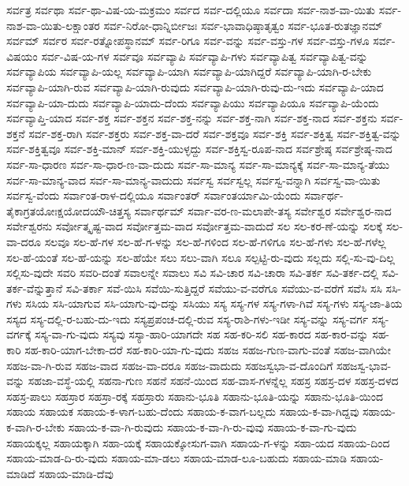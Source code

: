 {ಸರ್ವತ್ರ
ಸರ್ವಥಾ
ಸರ್ವ-ಥಾ-ವಿಷ-ಯ-ಮಕ್ರಮಂ
ಸರ್ವದ
ಸರ್ವ-ದಲ್ಲಿಯೂ
ಸರ್ವದಾ
ಸರ್ವ-ನಾಶ-ವಾ-ಯಿತು
ಸರ್ವ-ನಾಶ-ವಾ-ಯಿತು-ಲಕ್ಷಾಂತರ
ಸರ್ವ-ನಿರೋ-ಧಾನ್ನಿರ್ಬೀಜಃ
ಸರ್ವ-ಭಾವಾಧಿಷ್ಠಾತೃತ್ವಂ
ಸರ್ವ-ಭೂತ-ರುತಜ್ಞಾನಮ್
ಸರ್ವಮ್
ಸರ್ವರ
ಸರ್ವ-ರತ್ನೋಪಸ್ಥಾನಮ್
ಸರ್ವ-ರಿಗೂ
ಸರ್ವ-ವನ್ನು
ಸರ್ವ-ವಸ್ತು-ಗಳ
ಸರ್ವ-ವಸ್ತು-ಗಳೂ
ಸರ್ವ-ವಿಷಯಂ
ಸರ್ವ-ವಿಷ-ಯ-ಗಳ
ಸರ್ವವೂ
ಸರ್ವವ್ಯಾಪಿ
ಸರ್ವವ್ಯಾಪಿ-ಗಳು
ಸರ್ವವ್ಯಾಪಿತ್ವ
ಸರ್ವವ್ಯಾಪಿತ್ವ-ವನ್ನು
ಸರ್ವವ್ಯಾಪಿಯ
ಸರ್ವವ್ಯಾಪಿ-ಯಲ್ಲ
ಸರ್ವವ್ಯಾಪಿ-ಯಾಗಿ
ಸರ್ವವ್ಯಾಪಿ-ಯಾಗಿದ್ದರೆ
ಸರ್ವವ್ಯಾಪಿ-ಯಾಗಿ-ರ-ಬೇಕು
ಸರ್ವವ್ಯಾಪಿ-ಯಾಗಿ-ರುವ
ಸರ್ವವ್ಯಾಪಿ-ಯಾಗಿ-ರುವುದು
ಸರ್ವವ್ಯಾಪಿ-ಯಾಗಿ-ರುವು-ದು-ಇದು
ಸರ್ವವ್ಯಾಪಿ-ಯಾದ
ಸರ್ವವ್ಯಾಪಿ-ಯಾ-ದುದು
ಸರ್ವವ್ಯಾಪಿ-ಯಾದು-ದೆಂದು
ಸರ್ವವ್ಯಾಪಿಯು
ಸರ್ವವ್ಯಾಪಿಯೂ
ಸರ್ವವ್ಯಾಪಿ-ಯೆಂದು
ಸರ್ವವ್ಯಾಪ್ತಿ-ಯಾದ
ಸರ್ವ-ಶಕ್ತ
ಸರ್ವ-ಶಕ್ತನ
ಸರ್ವ-ಶಕ್ತ-ನನ್ನು
ಸರ್ವ-ಶಕ್ತ-ನಾಗಿ
ಸರ್ವ-ಶಕ್ತ-ನಾದ
ಸರ್ವ-ಶಕ್ತನು
ಸರ್ವ-ಶಕ್ತನೆ
ಸರ್ವ-ಶಕ್ತ-ರಾಗಿ
ಸರ್ವ-ಶಕ್ತರು
ಸರ್ವ-ಶಕ್ತ-ವಾ-ದರೆ
ಸರ್ವ-ಶಕ್ತವೂ
ಸರ್ವ-ಶಕ್ತಿ
ಸರ್ವ-ಶಕ್ತಿತ್ವ
ಸರ್ವ-ಶಕ್ತಿತ್ವ-ವನ್ನು
ಸರ್ವ-ಶಕ್ತಿತ್ವವೂ
ಸರ್ವ-ಶಕ್ತಿ-ಮಾನ್
ಸರ್ವ-ಶಕ್ತಿ-ಯುಳ್ಳದ್ದು
ಸರ್ವ-ಶಕ್ತಿಸ್ವ-ರೂಪ-ನಾದ
ಸರ್ವಶ್ರೇಷ್ಠ
ಸರ್ವಶ್ರೇಷ್ಠ-ನಾದ
ಸರ್ವ-ಸಾ-ಧಾರಣ
ಸರ್ವ-ಸಾ-ಧಾರ-ಣ-ವಾ-ದುದು
ಸರ್ವ-ಸಾ-ಮಾನ್ಯ
ಸರ್ವ-ಸಾ-ಮಾನ್ಯಕ್ಕೆ
ಸರ್ವ-ಸಾ-ಮಾನ್ಯ-ತೆಯು
ಸರ್ವ-ಸಾ-ಮಾನ್ಯ-ವಾದ
ಸರ್ವ-ಸಾ-ಮಾನ್ಯ-ವಾದುದು
ಸರ್ವಸ್ವ
ಸರ್ವಸ್ವಲ್ಲ
ಸರ್ವಸ್ವ-ವನ್ನಾಗಿ
ಸರ್ವಸ್ವ-ವಾ-ಯಿತು
ಸರ್ವಸ್ವ-ವೆಂದು
ಸರ್ವಾಂತ-ರಾಳ-ದಲ್ಲಿಯೂ
ಸರ್ವಾಂತರ್
ಸರ್ವಾಂತರ್ಯಾಮಿ-ಯೆಂದು
ಸರ್ವಾರ್ಥ-ತೈಕಾಗ್ರತಯೋಃಕ್ಷಯೋದಯೌ-ಚಿತ್ತಸ್ಯ
ಸರ್ವಾರ್ಥಮ್
ಸರ್ವಾ-ವರ-ಣ-ಮಲಾಪೇ-ತಸ್ಯ
ಸರ್ವೇಶ್ವರ
ಸರ್ವೇಶ್ವರ-ನಾದ
ಸರ್ವೇಶ್ವರನು
ಸರ್ವೋತ್ಕೃಷ್ಟ-ವಾದ
ಸರ್ವೋತ್ತಮ-ವಾದ
ಸರ್ವೋತ್ತಮ-ವಾದುದೆ
ಸಲ
ಸಲ-ಕರ-ಣೆ-ಯನ್ನು
ಸಲಕ್ಕೆ
ಸಲ-ವಾ-ದರೂ
ಸಲವೂ
ಸಲ-ಹೆ-ಗಳ
ಸಲ-ಹೆ-ಗ-ಳನ್ನು
ಸಲ-ಹೆ-ಗಳಿಂದ
ಸಲ-ಹೆ-ಗಳಿಗೂ
ಸಲ-ಹೆ-ಗಳು
ಸಲ-ಹೆ-ಗಳೆಲ್ಲ
ಸಲ-ಹೆ-ಯಂತೆ
ಸಲ-ಹೆ-ಯನ್ನು
ಸಲ-ಹೆಯೇ
ಸಲು
ಸಲು-ವಾಗಿ
ಸಲೂ
ಸಲ್ಪಟ್ಟಿ-ರು-ವುದು
ಸಲ್ಲದು
ಸಲ್ಲಿ-ಸು-ವು-ದಿಲ್ಲ
ಸಲ್ಲಿಸು-ವುದೇ
ಸವರಿ
ಸವರಿ-ದಂತೆ
ಸವಾಲನ್ನೇ
ಸವಾಲು
ಸವಿ
ಸವಿ-ಚಾರ
ಸವಿ-ಚಾರಾ
ಸವಿ-ತರ್ಕ
ಸವಿ-ತರ್ಕ-ದಲ್ಲಿ
ಸವಿ-ತರ್ಕ-ವೆನ್ನುತ್ತಾನೆ
ಸವಿ-ತರ್ಕಾ
ಸವೆ-ಯಿಸಿ
ಸವೆಯಿ-ಸುತ್ತಿದ್ದರೆ
ಸವೆಯು-ವ-ವರೆಗೂ
ಸವೆಯು-ವ-ವರೆಗೆ
ಸವೆಸಿ
ಸಸಿ
ಸಸಿ-ಗಳು
ಸಸಿಯ
ಸಸಿ-ಯಾಗುವ
ಸಸಿ-ಯಾಗು-ವು-ದನ್ನು
ಸಸಿಯು
ಸಸ್ಯ
ಸಸ್ಯ-ಗಳ
ಸಸ್ಯ-ಗಳಾ-ಗಿವೆ
ಸಸ್ಯ-ಗಳು
ಸಸ್ಯ-ಜಾ-ತಿಯ
ಸಸ್ಯದ
ಸಸ್ಯ-ದಲ್ಲಿ-ರ-ಬಹು-ದು-ಇದು
ಸಸ್ಯಪ್ರಪಂಚ-ದಲ್ಲಿ-ರುವ
ಸಸ್ಯ-ರಾಶಿ-ಗಳು-ಇಡೀ
ಸಸ್ಯ-ವನ್ನು
ಸಸ್ಯ-ವರ್ಗ
ಸಸ್ಯ-ವರ್ಗಕ್ಕೆ
ಸಸ್ಯ-ವಾ-ಗು-ವುದು
ಸಸ್ಯವು
ಸಸ್ಯಾ-ಹಾರಿ-ಯಾಗದೇ
ಸಹ
ಸಹ-ಕರಿ-ಸಲಿ
ಸಹ-ಕಾರದ
ಸಹ-ಕಾರ-ವನ್ನು
ಸಹ-ಕಾರಿ
ಸಹ-ಕಾರಿ-ಯಾಗ-ಬೇಕಾ-ದರೆ
ಸಹ-ಕಾರಿ-ಯಾ-ಗು-ವುದು
ಸಹಜ
ಸಹಜ-ಗುಣ-ವಾಗು-ವಂತೆ
ಸಹಜ-ವಾಗಿಯೇ
ಸಹಜ-ವಾ-ಗಿ-ರುವ
ಸಹಜ-ವಾದ
ಸಹಜ-ವಾ-ದರೂ
ಸಹಜ-ವಾದುದು
ಸಹಜಸ್ವಭಾ-ವ-ದೊಂದಿಗೆ
ಸಹಜಸ್ವ-ಭಾವ-ವನ್ನು
ಸಹಜಾ-ವಸ್ಥೆ-ಯಲ್ಲಿ
ಸಹನಾ-ಗುಣ
ಸಹನೆ
ಸಹನೆ-ಯಿಂದ
ಸಹ-ವಾಸ-ಗಳನ್ನೆಲ್ಲ
ಸಹಸ್ರ
ಸಹಸ್ರ-ದಳ
ಸಹಸ್ರ-ದಳದ
ಸಹಸ್ರ-ಪಾಲು
ಸಹಸ್ರಾರ
ಸಹಸ್ರಾ-ರಕ್ಕೆ
ಸಹಸ್ರಾರು
ಸಹಾನು-ಭೂತಿ
ಸಹಾನು-ಭೂತಿ-ಯನ್ನು
ಸಹಾನು-ಭೂತಿ-ಯಿಂದ
ಸಹಾಯ
ಸಹಾಯಕ
ಸಹಾಯ-ಕ-ಳಾಗ-ಬಹು-ದೆಂದು
ಸಹಾಯ-ಕ-ವಾಗ-ಬಲ್ಲದು
ಸಹಾಯ-ಕ-ವಾ-ಗಿದ್ದವು
ಸಹಾಯ-ಕ-ವಾಗಿ-ರ-ಬೇಕು
ಸಹಾಯ-ಕ-ವಾ-ಗಿ-ರುವುದು
ಸಹಾಯ-ಕ-ವಾ-ಗಿ-ರು-ವುವು
ಸಹಾಯ-ಕ-ವಾ-ಗು-ವುದು
ಸಹಾಯಕ್ಕಲ್ಲ
ಸಹಾಯಕ್ಕಾಗಿ
ಸಹಾ-ಯಕ್ಕೆ
ಸಹಾಯಕ್ಕೋಸುಗ-ವಾಗಿ
ಸಹಾಯ-ಗ-ಳನ್ನು
ಸಹಾ-ಯದ
ಸಹಾಯ-ದಿಂದ
ಸಹಾಯ-ಮಾಡ-ದಿ-ರು-ವುದು
ಸಹಾಯ-ಮಾ-ಡಲು
ಸಹಾಯ-ಮಾಡ-ಲೂ-ಬಹುದು
ಸಹಾಯ-ಮಾಡಿ
ಸಹಾಯ-ಮಾಡಿದೆ
ಸಹಾಯ-ಮಾಡಿ-ದೆವು
}
